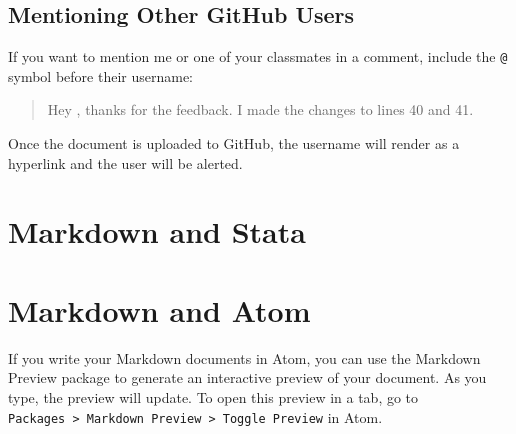 \documentclass[]{book}
\theoremstyle{definition}
\theoremstyle{definition}
\theoremstyle{definition}
\theoremstyle{remark}
\begin{document}
\subsection{Mentioning Other GitHub
Users}\label{mentioning-other-github-users}

If you want to mention me or one of your classmates in a comment,
include the \texttt{@} symbol before their username:

\begin{quote}
Hey \citet{chris-prener}, thanks for the feedback. I made the changes to
lines 40 and 41.
\end{quote}

Once the document is uploaded to GitHub, the username will render as a
hyperlink and the user will be alerted.

\section{Markdown and Stata}\label{markdown-and-stata}

\section{Markdown and Atom}\label{markdown-and-atom}

If you write your Markdown documents in Atom, you can use the Markdown
Preview package to generate an interactive preview of your document. As
you type, the preview will update. To open this preview in a tab, go to
\texttt{Packages\ \textgreater{}\ Markdown\ Preview\ \textgreater{}\ Toggle\ Preview}
in Atom.


\end{document}
